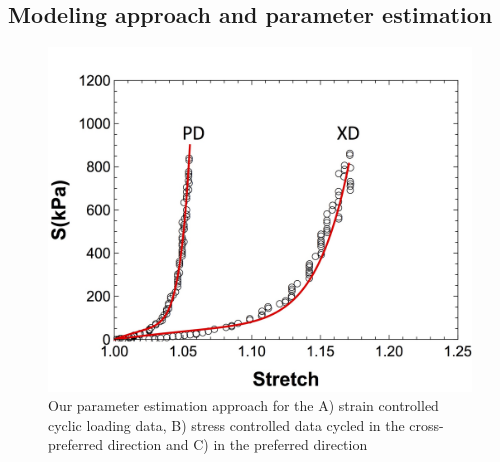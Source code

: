 \subsection{Modeling approach and parameter estimation}
\begin{figure}[hbt]
\centering
\centerline{\includegraphics[width=0.75\paperwidth]{Images/chapter4/figure11}}
\caption{Our parameter estimation approach for the A) strain controlled cyclic loading data, B) stress controlled data cycled in the cross-preferred direction and C) in the preferred direction}
\label{fig:datamethods}
\end{figure}

